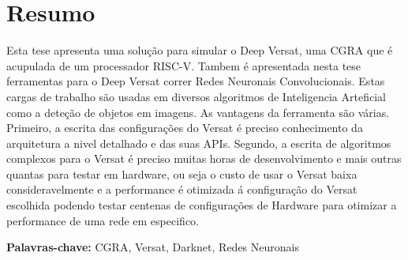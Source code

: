 
\section*{Resumo}


Esta tese apresenta uma solução para simular o Deep Versat, uma CGRA que é acupulada de um processador RISC-V.
Tambem é apresentada nesta tese ferramentas para o Deep Versat correr Redes Neuronais Convolucionais. Estas cargas de trabalho são
usadas em diversos algoritmos de Inteligencia Arteficial como a deteção de objetos em imagens. As vantagens da ferramenta são várias.
Primeiro, a escrita das configurações do Versat é preciso conhecimento da arquitetura a nivel detalhado e das suas APIs.
Segundo, a escrita de algoritmos complexos para o Versat é preciso muitas horas de desenvolvimento e mais outras quantas para testar em hardware, ou seja
o custo de usar o Versat baixa consideravelmente e a performance é otimizada á configuração do Versat escolhida podendo testar centenas de configurações de Hardware para otimizar a performance de uma rede em especifico.
\vfill

\textbf{\Large Palavras-chave:} CGRA, Versat, Darknet, Redes Neuronais

